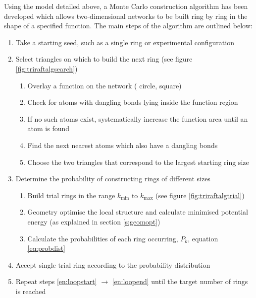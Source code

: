 Using the model detailed above, a Monte Carlo construction algorithm has been developed which allows two\--dimensional networks to be built ring by ring in the shape of a specified function. The main steps of the algorithm are outlined below:
\begin{enumerate}
	\item Take a starting seed, such as a single ring or experimental configuration
	\item Select triangles on which to build the next ring (see figure \ref{fig:triraftalgsearch})
		\label{en:loopstart}
		\begin{enumerate}
			\item Overlay a function on the network (\eg{} circle, square)
			\item Check for atoms with dangling bonds lying inside the function region
			\item If no such atoms exist, systematically increase the function area until an atom is found
			\item Find the next nearest atoms which also have a dangling bonds
			\item Choose the two triangles that correspond to the largest starting ring size	
		\end{enumerate}
	\item Determine the probability of constructing rings of different sizes
		\begin{enumerate}
			\item Build trial rings in the range $k_{\text{min}}$ to $k_{\text{max}}$ (see figure \ref{fig:triraftalgtrial})
			\item Geometry optimise the local structure and calculate minimised potential energy (as explained in section \ref{s:geomopt})
			\item Calculate the probabilities of each ring occurring, $P_k$, equation \eqref{eq:probdist}
		\end{enumerate}
	\item Accept single trial ring according to the probability distribution
		\label{en:loopend}
	\item Repeat steps \ref{en:loopstart} $\rightarrow$ \ref{en:loopend} until the target number of rings is reached
\end{enumerate}


